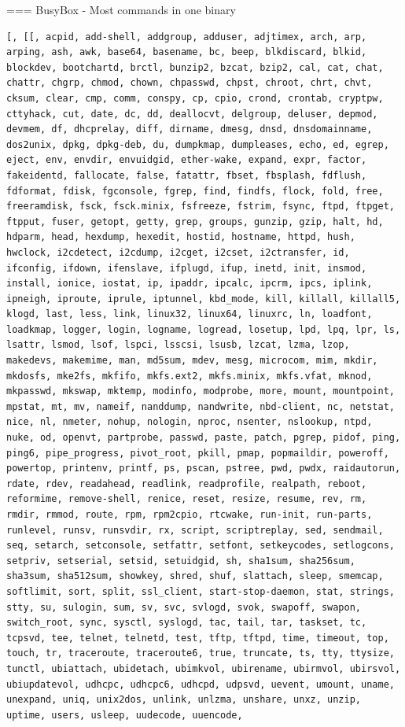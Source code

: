=== BusyBox - Most commands in one binary
  \tiny
  \begin{verbatim}
[, [[, acpid, add-shell, addgroup, adduser, adjtimex, arch, arp, arping, ash, awk, base64, basename, bc, beep, blkdiscard, blkid, blockdev, bootchartd, brctl, bunzip2, bzcat, bzip2, cal, cat, chat, chattr, chgrp, chmod, chown, chpasswd, chpst, chroot, chrt, chvt, cksum, clear, cmp, comm, conspy, cp, cpio, crond, crontab, cryptpw, cttyhack, cut, date, dc, dd, deallocvt, delgroup, deluser, depmod, devmem, df, dhcprelay, diff, dirname, dmesg, dnsd, dnsdomainname, dos2unix, dpkg, dpkg-deb, du, dumpkmap, dumpleases, echo, ed, egrep, eject, env, envdir, envuidgid, ether-wake, expand, expr, factor, fakeidentd, fallocate, false, fatattr, fbset, fbsplash, fdflush, fdformat, fdisk, fgconsole, fgrep, find, findfs, flock, fold, free, freeramdisk, fsck, fsck.minix, fsfreeze, fstrim, fsync, ftpd, ftpget, ftpput, fuser, getopt, getty, grep, groups, gunzip, gzip, halt, hd, hdparm, head, hexdump, hexedit, hostid, hostname, httpd, hush, hwclock, i2cdetect, i2cdump, i2cget, i2cset, i2ctransfer, id, ifconfig, ifdown, ifenslave, ifplugd, ifup, inetd, init, insmod, install, ionice, iostat, ip, ipaddr, ipcalc, ipcrm, ipcs, iplink, ipneigh, iproute, iprule, iptunnel, kbd_mode, kill, killall, killall5, klogd, last, less, link, linux32, linux64, linuxrc, ln, loadfont, loadkmap, logger, login, logname, logread, losetup, lpd, lpq, lpr, ls, lsattr, lsmod, lsof, lspci, lsscsi, lsusb, lzcat, lzma, lzop, makedevs, makemime, man, md5sum, mdev, mesg, microcom, mim, mkdir, mkdosfs, mke2fs, mkfifo, mkfs.ext2, mkfs.minix, mkfs.vfat, mknod, mkpasswd, mkswap, mktemp, modinfo, modprobe, more, mount, mountpoint, mpstat, mt, mv, nameif, nanddump, nandwrite, nbd-client, nc, netstat, nice, nl, nmeter, nohup, nologin, nproc, nsenter, nslookup, ntpd, nuke, od, openvt, partprobe, passwd, paste, patch, pgrep, pidof, ping, ping6, pipe_progress, pivot_root, pkill, pmap, popmaildir, poweroff, powertop, printenv, printf, ps, pscan, pstree, pwd, pwdx, raidautorun, rdate, rdev, readahead, readlink, readprofile, realpath, reboot, reformime, remove-shell, renice, reset, resize, resume, rev, rm, rmdir, rmmod, route, rpm, rpm2cpio, rtcwake, run-init, run-parts, runlevel, runsv, runsvdir, rx, script, scriptreplay, sed, sendmail, seq, setarch, setconsole, setfattr, setfont, setkeycodes, setlogcons, setpriv, setserial, setsid, setuidgid, sh, sha1sum, sha256sum, sha3sum, sha512sum, showkey, shred, shuf, slattach, sleep, smemcap, softlimit, sort, split, ssl_client, start-stop-daemon, stat, strings, stty, su, sulogin, sum, sv, svc, svlogd, svok, swapoff, swapon, switch_root, sync, sysctl, syslogd, tac, tail, tar, taskset, tc, tcpsvd, tee, telnet, telnetd, test, tftp, tftpd, time, timeout, top, touch, tr, traceroute, traceroute6, true, truncate, ts, tty, ttysize, tunctl, ubiattach, ubidetach, ubimkvol, ubirename, ubirmvol, ubirsvol, ubiupdatevol, udhcpc, udhcpc6, udhcpd, udpsvd, uevent, umount, uname, unexpand, uniq, unix2dos, unlink, unlzma, unshare, unxz, unzip, uptime, users, usleep, uudecode, uuencode, 
\end{verbatim}
